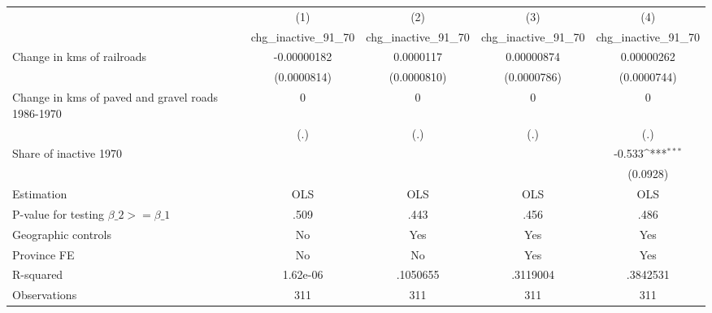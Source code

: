 {
\def\sym#1{\ifmmode^{#1}\else\(^{#1}\)\fi}
\begin{tabular}{l*{4}{c}}
\hline\hline
                &\multicolumn{1}{c}{(1)}&\multicolumn{1}{c}{(2)}&\multicolumn{1}{c}{(3)}&\multicolumn{1}{c}{(4)}\\
                &\multicolumn{1}{c}{chg\_inactive\_91\_70}&\multicolumn{1}{c}{chg\_inactive\_91\_70}&\multicolumn{1}{c}{chg\_inactive\_91\_70}&\multicolumn{1}{c}{chg\_inactive\_91\_70}\\
\hline
Change in kms of railroads&-0.00000182         &0.0000117         &0.00000874         &0.00000262         \\
                &(0.0000814)         &(0.0000810)         &(0.0000786)         &(0.0000744)         \\
[1em]
Change in kms of paved and gravel roads 1986-1970&        0         &        0         &        0         &        0         \\
                &      (.)         &      (.)         &      (.)         &      (.)         \\
[1em]
Share of inactive 1970&                  &                  &                  &   -0.533\sym{***}\\
                &                  &                  &                  & (0.0928)         \\
\hline
Estimation      &      OLS         &      OLS         &      OLS         &      OLS         \\
P-value for testing $\beta\_2 >= \beta\_1$&     .509         &     .443         &     .456         &     .486         \\
Geographic controls&       No         &      Yes         &      Yes         &      Yes         \\
Province FE     &       No         &       No         &      Yes         &      Yes         \\
R-squared       & 1.62e-06         & .1050655         & .3119004         & .3842531         \\
Observations    &      311         &      311         &      311         &      311         \\
\hline\hline
\end{tabular}
}
